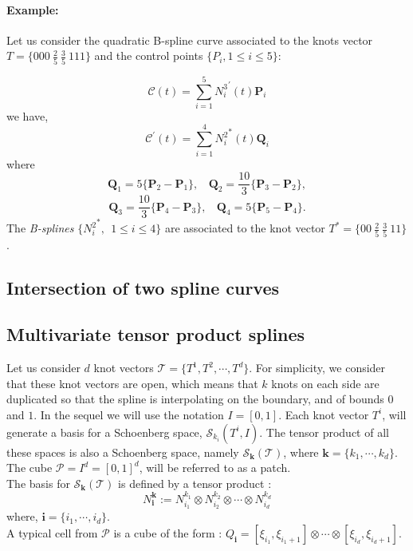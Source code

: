 \paragraph{Example:} 
Let us consider the quadratic B-spline curve associated to the knots vector $T=\{000~\frac{2}{5}~\frac{3}{5}~111 \}$ and the control points $\{ P_i, 1 \leq i \leq 5 \}$:

$$
\mathcal{C}(t) = \sum_{i=1}^{5} {N_{i}^{3}}^{\prime}(t) \mathbf{P}_i 
$$
we have, 
$$
\mathcal{C}^{\prime}(t) = \sum_{i=1}^{4} {N_{i}^{2}}^{\ast}(t) \mathbf{Q}_i
$$
where 
$$
\mathbf{Q}_1 = 5 \{\mathbf{P}_{2} - \mathbf{P}_1\}, ~~~~\mathbf{Q}_2 = \frac{10}{3} \{ \mathbf{P}_{3} - \mathbf{P}_2\},
$$
$$
\mathbf{Q}_3 = \frac{10}{3} \{ \mathbf{P}_{4} - \mathbf{P}_3\},~~~~\mathbf{Q}_4 = 5 \{\mathbf{P}_{5} - \mathbf{P}_4\}.
$$
The \textit{B-splines} $\{ {N_{i}^{2}}^{\ast},~~1 \leq i \leq 4\}$ are associated to the knot vector $T^{\ast}=\{00~\frac{2}{5}~\frac{3}{5}~11 \}$. 

\subsection{Intersection of two spline curves}

\subsection{Multivariate tensor product splines}
Let us consider $d$ knot vectors $ \mathcal{T} = \{T^1,T^2,\cdots,T^d\}$. For simplicity, we consider that these knot vectors are open, which means that $k$ knots on each side are duplicated so that the spline is interpolating on the boundary, and of bounds $0$ and $1$. In the sequel we will use the notation $I=[0,1]$.
Each knot vector $T^i$, will generate a basis for a Schoenberg space, $\mathcal{S}_{k_{i}}(T^i,I)$. The tensor product of all these spaces is also a Schoenberg space, namely $\mathcal{S}_{\mathbf{k}}(\mathcal{T})$, where $\mathbf{k}=\{k_1,\cdots,k_d\}$. The cube $\mathcal{P}=I^d=[0,1]^d$, will be referred to as a patch.
\\
The basis for $\mathcal{S}_{\mathbf{k}}(\mathcal{T})$ is defined by a tensor product :
$$
N_{\mathbf{i}}^{\mathbf{k}} := N_{i_1}^{k_1} \otimes N_{i_2}^{k_2} \otimes \cdots \otimes N_{i_d}^{k_d}
$$
where, $\mathbf{i}=\{i_1,\cdots , i_d \}$.
\\
A typical cell from $\mathcal{P}$ is a cube of the form : $Q_{\mathbf{i}}=[\xi_{i_1}, \xi_{i_1+1}] \otimes \cdots \otimes [\xi_{i_d}, \xi_{i_d+1}]$. %
